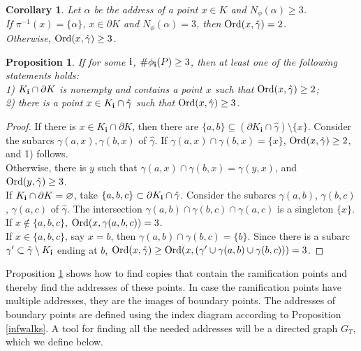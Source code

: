 \documentclass[11pt,reqno]{amsart}
\newtheorem{corollary}[theorem]{Corollary}
\newtheorem{proposition}[theorem]{Proposition}
\newcommand{\Ord}{\mathop{\rm Ord}\nolimits}
\newcommand{\bi}{{\bm i}}
\newcommand{\IN}{{\subseteq}}
\newcommand{\ga}{{\gamma}}
\newcommand{\hga}{{\hat\gamma}}
\newcommand{\Nfi}{{N_\phi}}
\begin{document}
 \begin{corollary}\label{ram_adr}
        Let  $\alpha$ be the address of a point $x\in K$ and $\Nfi(\alpha) \ge 3$.\\ If $\pi^{-1}(x)=\{\alpha\}$, $x\in\partial K$ and $\Nfi(\alpha) = 3$, then ${\rm Ord}(x,\hga)=2$.\\ Otherwise,  ${\mathop{\rm Ord} \nolimits}(x,\hga) \ge 3$.
\end{corollary}

\begin{proposition}\label{ram_p}
       If  for some $\bf{i} $, $\#\phi_{\bf{i}}(P) \ge 3$, then at least  one of the following statements holds:\\
1) $K_{\bf{i}}\cap \partial K$  is nonempty and contains a point  $x$ such that  ${\mathop{\rm Ord} \nolimits}(x,\hga) \geq 2$;\\
2) there is a point  $x \in K_{\bf{i}} \cap \hat{\gamma}$ such that  ${\mathop{\rm Ord} \nolimits}(x,\hga) \geq 3$.
\end{proposition}

\begin{proof}
If there is $x\in K_\bi\cap \partial K$, then there are $ \{a,b\} \IN (\partial K_\bi \cap \hga)\setminus\{x\}$. Consider the subarcs $\ga(a,x), \ga(b,x)$ of $\hga$. If $\ga(a,x)\cap \ga(b,x)=\{x\}$, ${\Ord}(x,  \hga) \ge 2$, and 1) follows. \\
Otherwise, there is $y$ such that $\gamma(a,x)\cap \gamma(b,x)=\gamma(y,x)$, and
${\mathop{\rm Ord} \nolimits}(y,  \hga) \geq 3$.\\
If $K_{\bf{i}}\cap \partial K=\varnothing$, take $ \{a,b,c\} \subset \partial K_{\bf{i}} \cap \hat{\gamma}$. 
 Consider the subarcs $\gamma(a,b)$, $\gamma(b,c)$, $\gamma(a,c)$ of $\hat{\gamma}$. The  intersection  $\gamma(a,b) \cap \gamma(b,c) \cap \gamma(a,c)$ is a singleton $\{x\}$.
 If $x \notin \{a,b,c\}$, ${\mathop{\rm Ord} \nolimits}(x, \gamma(a,b,c)) = 3$.\\
If $x \in \{a,b,c\}$, say $x=b$, then $\gamma(a,b) \cap \gamma(b,c) = \{b\}$. Since there is a subarc $\gamma'\subset\hga\setminus{K_{\bf{i}}}$  ending at  $b$, ${\mathop{\rm Ord} \nolimits}(x, \hga) \ge {\mathop{\rm Ord} \nolimits}(x,  (\gamma'\cup \gamma(a,b) \cup \gamma(b,c)) ) =3$.
\end{proof}
Proposition \ref{ram_p}  shows how to find  copies that contain the ramification points and thereby find the addresses of these points. In case the ramification points have multiple addresses, they are the images of boundary points. The addres\-ses of  boundary points are defined using the index diagram according to Pro\-po\-sition \ref{infwalks}. A tool for finding all the needed addresses will be a directed  graph $G_T$, which we define  below.\\
\end{document}
